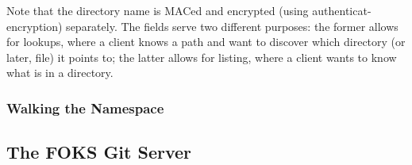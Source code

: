 Note that the directory name is MACed and encrypted (using authenticat-encryption) separately.
The fields serve two different purposes: the former allows for lookups, where a client knows
a path and want to discover which directory (or later, file) it points to; the latter allows
for listing, where a client wants to know what is in a directory.

\subsubsection{Walking the Namespace}
\label{sec:walk}






\subsection{The FOKS Git Server}